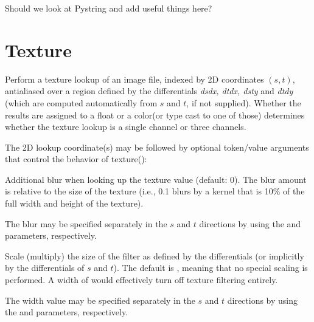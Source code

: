 \documentclass[11pt,letterpaper]{book}
\def\color{{\cf color}\xspace}
\def\float{{\cf float}\xspace}
\begin{document}
\begin{annotate}
Should we look at Pystring and add useful things here?
\end{annotate}


\section{Texture}
\label{sec:stdlib:texture}


Perform a texture lookup of an image file, indexed by 2D coordinates
$(s,t)$, antialiased over a region defined by the differentials
\emph{dsdx, dtdx, dsty} and \emph{dtdy} (which are computed
automatically from $s$ and $t$, if not supplied).  Whether the results
are assigned to a \float or a \color (or type cast to one of those)
determines whether the texture lookup is a single channel or three
channels.

The 2D lookup coordinate(s) may be followed by optional token/value
arguments that control the behavior of {\cf texture()}:

\vspace{12pt}
Additional blur when looking up the texture value (default: 0).  The
blur amount is relative to the size of the texture (i.e., 0.1 blurs by a
kernel that is 10\% of the full width and height of the texture).

The blur may be specified separately in the $s$ and $t$ directions by
using the  and  parameters, respectively.
\apiend
\vspace{-16pt}

\vspace{12pt}
Scale (multiply) the size of the filter as defined by the differentials
(or implicitly by the differentials of $s$ and $t$).  The default is
{}, meaning that no special scaling is performed.  A width of
{} would effectively turn off texture filtering entirely.

The width value may be specified separately in the $s$ and $t$
directions by using the  and  parameters,
respectively.
\apiend
\vspace{-16pt}
\end{document}
